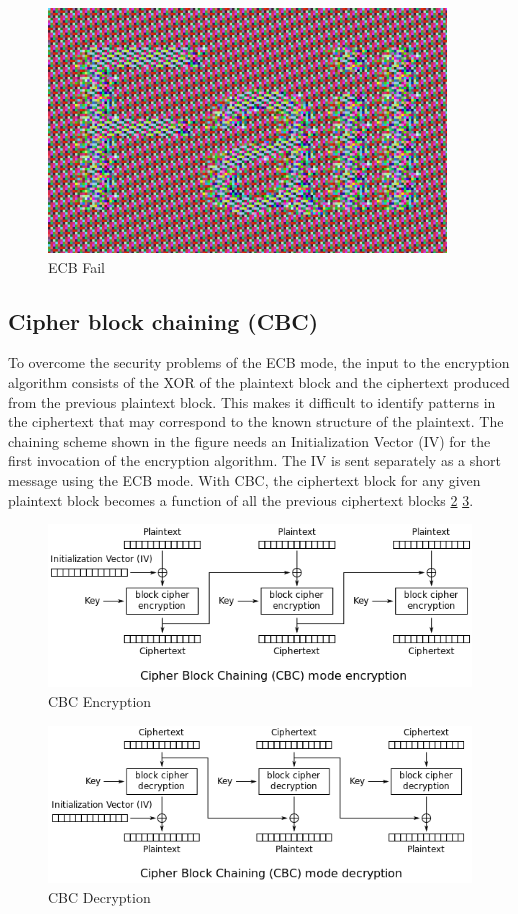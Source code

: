 \begin{figure}
	\centering
	\includegraphics[width=0.7\linewidth]{Images/Chapter3/ECB_Fail}
	\caption{ECB Fail}
	\label{fig:ECB_Fail}
\end{figure}


\subsection{Cipher block chaining (CBC)}

To overcome the security problems of the ECB mode, the input to the encryption algorithm consists of the XOR of the plaintext block and the ciphertext produced from the previous plaintext block. This makes it difficult to identify patterns in the ciphertext that may correspond to the known structure of the plaintext. The chaining scheme shown in the figure needs an Initialization Vector (IV) for the first invocation of the encryption algorithm. The IV is sent separately as a short message using the ECB mode. With CBC, the ciphertext block for any given plaintext block becomes a function of all the previous ciphertext blocks \ref{fig:CBC_Encryption} \ref{fig:CBC_Decryption}.

\begin{figure}
	\centering
	\includegraphics[width=0.7\linewidth]{Images/Chapter3/CBC_Encryption}
	\caption{CBC Encryption}
	\label{fig:CBC_Encryption}
\end{figure}

\begin{figure}
	\centering
	\includegraphics[width=0.7\linewidth]{Images/Chapter3/CBC_Decryption}
	\caption{CBC Decryption}
	\label{fig:CBC_Decryption}
\end{figure}

